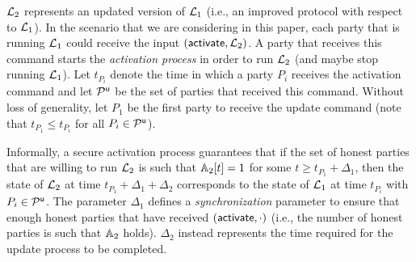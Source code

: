$\mathcal{L}_2$ represents an updated version of $\mathcal{L}_1$ (i.e., an improved protocol with respect to $\mathcal{L}_1$).
In the scenario that we are considering in this paper, each party that is running $\mathcal{L}_1$ could receive the input $(\mathsf{activate}, \mathcal{L}_2)$. A party
that receives this command starts the \emph{activation process}
in order to run $\mathcal{L}_2$ (and maybe stop running $\mathcal{L}_1$).
Let $t_{P_i}$ denote the time in which
a party $P_i$ receives the activation command and let $\mathcal{P}^\mathsf{u}$ be the set of parties that received this command. Without loss of generality, let $P_1$ be the first party to receive the update command (note that $t_{P_1}\leq t_{P_i}$ for all $P_i\in\mathcal{P}^\mathsf{u}$).

Informally, a secure activation process guarantees that if the set of honest parties that are willing to run $\mathcal{L}_2$
is such that $\mathbb{A}_2[t]=1$ for some $t\geq t_{P_1}+\Delta_1$, then
the state of $\mathcal{L}_2$ at time $t_{P_1}+\Delta_1+\Delta_2$ corresponds to the state of $\mathcal{L}_1$ at time $t_{P_i}$ with $P_i\in\mathcal{P}^\mathsf{u}$.
The parameter $\Delta_1$ defines a \emph{synchronization} parameter to ensure that enough honest parties that have received $(\mathsf{activate},\cdot)$ (i.e., the number of honest parties is such that $\mathbb{A}_2$ holds). $\Delta_2$ instead represents the time required for the update process to be completed.




